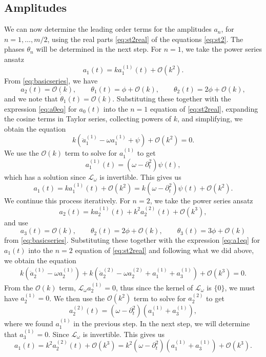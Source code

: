 \documentclass[11pt,reqno]{amsart}
\def\Lw{{\mathcal{L}_\omega}}
\begin{document}
\subsection{Amplitudes}
We can now determine the leading order terms for the amplitudes $a_n$, for $n = 1, \dots, m/2$, using the real parts \cref{eq:st2real} of the equations \cref{eq:st2}. The phases $\theta_n$ will be determined in the next step. For $n=1$, we take the power series ansatz 
\[
a_1(t) = k a_1^{(1)}(t) + \mathcal{O}(k^2).
\]
From \cref{eq:basicseries}, we have
\[
a_2(t) = \mathcal{O}(k), \qquad \theta_1(t) = \phi + \mathcal{O}(k), \qquad \theta_2(t) = 2 \phi + \mathcal{O}(k),
\]
and we note that $\dot \theta_1(t) = \mathcal{O}(k)$. Substituting these together with the expression \cref{eq:a0eq} for $a_0(t)$ into the $n=1$ equation of \cref{eq:st2real}, expanding the cosine terms in Taylor series, collecting powers of $k$, and simplifying, we obtain the equation
\[
k\left(\ddot a_1^{(1)} - \omega a_1^{(1)} + \psi\right) + \mathcal{O}(k^2) = 0.
\]
We use the $\mathcal{O}(k)$ term to solve for $a_1^{(1)}$ to get 
\begin{equation}\label{eq:a11}
a_1^{(1)}(t) = (\omega - \partial_t^2) \psi(t),
\end{equation}
which has a solution since $\Lw$ is invertible. This gives us
\begin{equation}\label{eq:a1eq}
a_1(t) = k a_1^{(1)}(t) + \mathcal{O}(k^2) = k (\omega - \partial_t^2) \psi(t) + \mathcal{O}(k^2).
\end{equation}
We continue this process iteratively. For $n = 2$, we take the power series ansatz 
\[
a_2(t) = k a_2^{(1)}(t) + k^2 a_2^{(2)}(t) + \mathcal{O}(k^3),
\]
and use
\[
a_3(t) = \mathcal{O}(k), \qquad \theta_2(t) = 2 \phi + \mathcal{O}(k), \qquad \theta_3(t) = 3 \phi + \mathcal{O}(k)
\]
from \cref{eq:basicseries}. Substituting these together with the expression \cref{eq:a1eq} for $a_1(t)$ into the $n=2$ equation of \cref{eq:st2real} and following what we did above, we obtain the equation
\begin{align*}
k\left(\ddot a_2^{(1)} - \omega a_2^{(1)}\right) + 
k\left(\ddot a_2^{(2)} - \omega a_2^{(2)} + a_1^{(1)} + a_3^{(1)}\right) +\mathcal{O}(k^3) = 0.
\end{align*}
From the $\mathcal{O}(k)$ term, $\Lw a_2^{(1)} = 0$, thus since the kernel of $\Lw$ is $\{ 0\}$, we must have $a_2^{(1)} = 0$. We then use the $\mathcal{O}(k^2)$ term to solve for $a_2^{(2)}$ to get 
\begin{equation}\label{eq:a22}
a_2^{(2)}(t) = (\omega - \partial_t^2)\left(a_1^{(1)} + a_3^{(1)}\right),
\end{equation}
where we found $a_1^{(1)}$ in the previous step. In the next step, we will determine that $a_3^{(1)} = 0$. Since $\Lw$ is invertible. This gives us
\begin{equation}\label{eq:a2eq}
a_1(t) = k^2 a_2^{(2)}(t) + \mathcal{O}(k^3) = k^2 (\omega - \partial_t^2) \left(a_1^{(1)} + a_3^{(1)}\right) + \mathcal{O}(k^3).
\end{equation}
\end{document}
